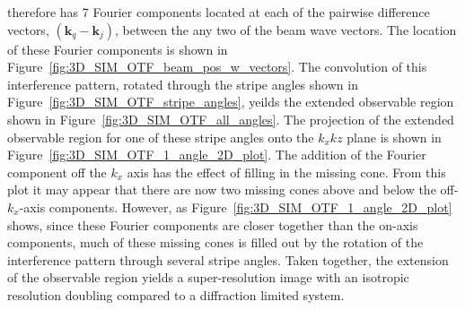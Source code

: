 therefore has 7 Fourier components located at each of the pairwise
difference vectors, $\left(\textbf{k}_{q}-\textbf{k}_{j}\right)$, 
between the any two of the beam wave vectors. The location of these 
Fourier components is shown in 
Figure~\ref{fig:3D_SIM_OTF_beam_pos_w_vectors}. The convolution of 
this interference pattern, rotated through the stripe angles shown
in Figure~\ref{fig:3D_SIM_OTF_stripe_angles}, yeilds the extended
observable region shown in Figure~\ref{fig:3D_SIM_OTF_all_angles}.
The projection of the extended observable region for one of these 
stripe angles onto the $k_{x}k{z}$ plane is shown in 
Figure~\ref{fig:3D_SIM_OTF_1_angle_2D_plot}. The addition of the
Fourier component off the $k_{x}$ axis has the effect of filling 
in the missing cone. From this plot it may appear that there are
now two missing cones above and below the off-$k_{x}$-axis components.
However, as Figure~\ref{fig:3D_SIM_OTF_1_angle_2D_plot} shows, 
since these Fourier components are closer together than the
on-axis components, much of these missing cones is filled out by 
the rotation of the interference pattern through several stripe
angles. Taken together, the extension of the observable region 
yields a super-resolution image with an isotropic resolution 
doubling compared to a diffraction limited 
system\cite{gustafsson2008three}.

